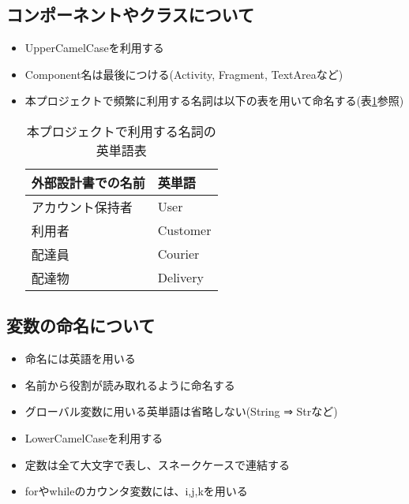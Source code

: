 \documentclass[a4j,titlepage]{jarticle}
\begin{document}
\subsection{コンポーネントやクラスについて}
\begin{itemize}
\item UpperCamelCaseを利用する
\item Component名は最後につける(Activity, Fragment, TextAreaなど)
\item 本プロジェクトで頻繁に利用する名詞は以下の表を用いて命名する(表\ref{termTable}参照)
\begin{table}[htb]
\centering
\caption{本プロジェクトで利用する名詞の英単語表}
\label{termTable}
\begin{tabular}{|ll|}
\hline
外部設計書での名前 & 英単語      \\ \hline
アカウント保持者  & User     \\
利用者       & Customer \\
配達員       & Courier  \\
配達物       & Delivery \\ \hline
\end{tabular}
\end{table}
\end{itemize}

\subsection{変数の命名について}
\begin{itemize}
\item 命名には英語を用いる
\item 名前から役割が読み取れるように命名する
\item グローバル変数に用いる英単語は省略しない(String ⇒ Strなど)
\item LowerCamelCaseを利用する
\item 定数は全て大文字で表し、スネークケースで連結する
\item forやwhileのカウンタ変数には、i,j,kを用いる
\end{itemize}
\end{document}
